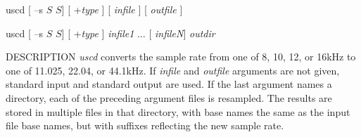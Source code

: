 % 
% 
% 
% 
%                                                                        
%
\hypertarget{uscd}{}

\begin{synopsis}
\item [uscd] [ --s $S$ $S$] [ +{\em type} ] [ {\em infile} ] [ {\em outfile} ]
\item [uscd] [ --s $S$ $S$] [ +{\em type} ] {\em infile1} $\dots$ [ {\em infileN}] {\em outdir} 
\end{synopsis}

\begin{qsection}{DESCRIPTION}
{\em uscd} converts the sample rate from one of 8, 10, 12, or 16kHz 
to one of 11.025, 22.04, or 44.1kHz.
If {\em infile} and {\em outfile} arguments are not given, 
standard input and standard output are used.
If the last argument names a directory, 
each of the preceding argument files is resampled. 
The results are stored in multiple files in that directory, 
with base names the same as the input file base names, 
but with suffixes reflecting the new sample rate.
\end{qsection}

